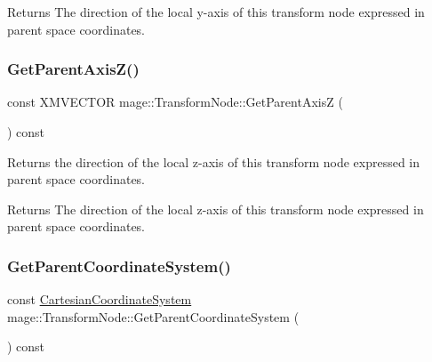\begin{DoxyReturn}{Returns}
The direction of the local y-\/axis of this transform node expressed in parent space coordinates. 
\end{DoxyReturn}
\hypertarget{structmage_1_1_transform_node_a65188d5be4f0bc4ff8bd822b659309cc}{}\label{structmage_1_1_transform_node_a65188d5be4f0bc4ff8bd822b659309cc} 
\subsubsection{\texorpdfstring{Get\+Parent\+Axis\+Z()}{GetParentAxisZ()}}
{\footnotesize\ttfamily const X\+M\+V\+E\+C\+T\+OR mage\+::\+Transform\+Node\+::\+Get\+Parent\+AxisZ (\begin{DoxyParamCaption}{ }\end{DoxyParamCaption}) const\hspace{0.3cm}{\ttfamily [noexcept]}}

Returns the direction of the local z-\/axis of this transform node expressed in parent space coordinates.

\begin{DoxyReturn}{Returns}
The direction of the local z-\/axis of this transform node expressed in parent space coordinates. 
\end{DoxyReturn}
\hypertarget{structmage_1_1_transform_node_af99de109dd3e211fdc5f06a65ccc1e89}{}\label{structmage_1_1_transform_node_af99de109dd3e211fdc5f06a65ccc1e89} 
\subsubsection{\texorpdfstring{Get\+Parent\+Coordinate\+System()}{GetParentCoordinateSystem()}}
{\footnotesize\ttfamily const \hyperlink{structmage_1_1_cartesian_coordinate_system}{Cartesian\+Coordinate\+System} mage\+::\+Transform\+Node\+::\+Get\+Parent\+Coordinate\+System (\begin{DoxyParamCaption}{ }\end{DoxyParamCaption}) const\hspace{0.3cm}{\ttfamily [noexcept]}}

